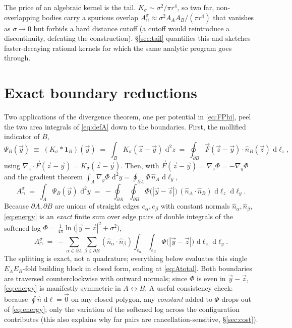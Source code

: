 \documentclass[11pt]{article}
\newcommand{\dd}{\,\mathrm{d}}
\newcommand{\nA}{\hat n_A}
\newcommand{\nB}{\hat n_B}
\newcommand{\Acap}{A^{\sigma}_{\cap}}
\begin{document}
The price of an algebraic kernel is the tail.  $K_\sigma\sim\sigma^2/\pi r^4$, so
two far, non-overlapping bodies carry a spurious overlap
$\Acap\approx \sigma^2 A_A A_B/(\pi r^4)$ that vanishes as $\sigma\to0$ but forbids a
hard distance cutoff (a cutoff would reintroduce a discontinuity, defeating the
construction).  \S\ref{sec:tail} quantifies this and sketches faster-decaying rational
kernels for which the same analytic program goes through.

\section{Exact boundary reductions}
\label{sec:reductions}

Two applications of the divergence theorem, one per potential in \eqref{eq:FPhi},
peel the two area integrals of \eqref{eq:defA} down to the boundaries.  First, the
mollified indicator of $B$,
\begin{equation}
  \Psi_B(\vec y) \;\equiv\; (K_\sigma*\mathbf 1_B)(\vec y)
  \;=\;\int_B K_\sigma(\vec z-\vec y)\,\dd^2 z
  \;=\;\oint_{\partial B} \vec F(\vec z-\vec y)\cdot\nB(\vec z)\,\dd\ell_z ,
  \label{eq:Psidef}
\end{equation}
using $\nabla_{\!z}\!\cdot\!\vec F(\vec z-\vec y)=K_\sigma(\vec z-\vec y)$.  Then,
with $\vec F(\vec z-\vec y) = \nabla_{\!z}\Phi = -\nabla_{\!y}\Phi$ and the gradient
theorem $\int_A \nabla_{\!y}\Phi\,\dd^2y = \oint_{\partial A}\Phi\,\nA\,\dd\ell_y$,
\begin{equation}
  \Acap \;=\; \int_A \Psi_B(\vec y)\,\dd^2 y
        \;=\; -\oint_{\partial A}\oint_{\partial B}
              \Phi\bigl(|\vec y-\vec z|\bigr)\,(\nA\!\cdot\!\nB)\,
              \dd\ell_z\,\dd\ell_y .
  \label{eq:energy}
\end{equation}
Because $\partial A,\partial B$ are unions of straight edges $e_\alpha,e_\beta$ with constant
normals $\hat n_\alpha,\hat n_\beta$, \eqref{eq:energy} is an \emph{exact} finite sum over edge
pairs of double integrals of the softened log
$\Phi=\tfrac1{4\pi}\ln\!\bigl(|\vec y-\vec z|^2+\sigma^2\bigr)$,
\begin{equation}
  \Acap \;=\; -\sum_{\alpha\in\partial A}\sum_{\beta\in\partial B}
        (\hat n_\alpha\!\cdot\!\hat n_\beta)
        \int_{e_\alpha}\!\!\int_{e_\beta}\Phi\bigl(|\vec y-\vec z|\bigr)\,
        \dd\ell_z\,\dd\ell_y .
  \label{eq:edgesum}
\end{equation}
The splitting is exact, not a quadrature; everything below evaluates this single
$E_A E_B$-fold building block in closed form, ending at \eqref{eq:Atotal}.
Both boundaries are traversed counterclockwise with outward normals; since $\Phi$ is
even in $\vec y-\vec z$, \eqref{eq:energy} is manifestly symmetric in
$A\leftrightarrow B$.  A useful consistency check: because
$\oint \hat n\,\dd\ell = \vec 0$ on any closed polygon, any \emph{constant} added to
$\Phi$ drops out of \eqref{eq:energy}; only the variation of the softened log across
the configuration contributes (this also explains why far pairs are
cancellation-sensitive, \S\ref{sec:cost}).
\end{document}
